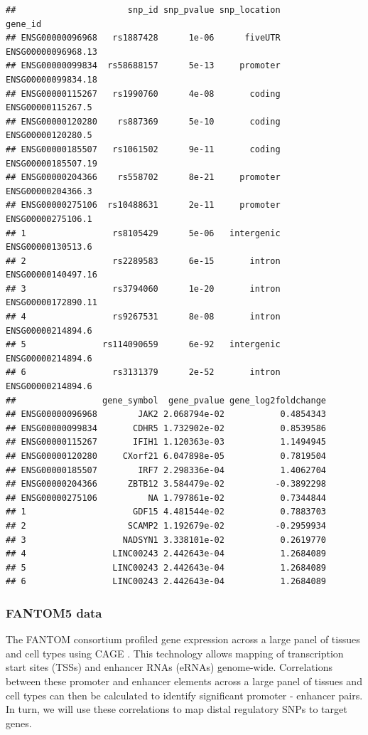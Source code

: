 \documentclass[9pt,a4paper,]{extarticle}
\begin{document}
\begin{verbatim}
##                      snp_id snp_pvalue snp_location            gene_id
## ENSG00000096968   rs1887428      1e-06      fiveUTR ENSG00000096968.13
## ENSG00000099834  rs58688157      5e-13     promoter ENSG00000099834.18
## ENSG00000115267   rs1990760      4e-08       coding  ENSG00000115267.5
## ENSG00000120280    rs887369      5e-10       coding  ENSG00000120280.5
## ENSG00000185507   rs1061502      9e-11       coding ENSG00000185507.19
## ENSG00000204366    rs558702      8e-21     promoter  ENSG00000204366.3
## ENSG00000275106  rs10488631      2e-11     promoter  ENSG00000275106.1
## 1                 rs8105429      5e-06   intergenic  ENSG00000130513.6
## 2                 rs2289583      6e-15       intron ENSG00000140497.16
## 3                 rs3794060      1e-20       intron ENSG00000172890.11
## 4                 rs9267531      8e-08       intron  ENSG00000214894.6
## 5               rs114090659      6e-92   intergenic  ENSG00000214894.6
## 6                 rs3131379      2e-52       intron  ENSG00000214894.6
##                 gene_symbol  gene_pvalue gene_log2foldchange
## ENSG00000096968        JAK2 2.068794e-02           0.4854343
## ENSG00000099834       CDHR5 1.732902e-02           0.8539586
## ENSG00000115267       IFIH1 1.120363e-03           1.1494945
## ENSG00000120280     CXorf21 6.047898e-05           0.7819504
## ENSG00000185507        IRF7 2.298336e-04           1.4062704
## ENSG00000204366      ZBTB12 3.584479e-02          -0.3892298
## ENSG00000275106          NA 1.797861e-02           0.7344844
## 1                     GDF15 4.481544e-02           0.7883703
## 2                    SCAMP2 1.192679e-02          -0.2959934
## 3                   NADSYN1 3.338101e-02           0.2619770
## 4                 LINC00243 2.442643e-04           1.2684089
## 5                 LINC00243 2.442643e-04           1.2684089
## 6                 LINC00243 2.442643e-04           1.2684089
\end{verbatim}

\subsubsection{FANTOM5 data}\label{fantom5-data}

The FANTOM consortium profiled gene expression across a large panel of tissues and cell types using CAGE \citep{Fantom2014, Andersson2014}.
This technology allows mapping of transcription start sites (TSSs) and enhancer RNAs (eRNAs) genome-wide.
Correlations between these promoter and enhancer elements across a large panel of tissues and cell types can then be calculated to identify significant promoter - enhancer pairs.
In turn, we will use these correlations to map distal regulatory SNPs to target genes.
\end{document}
